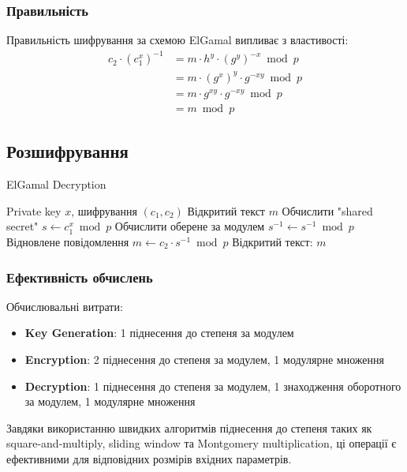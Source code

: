 \subsubsection{Правильність}

Правильність шифрування за схемою ElGamal випливає з властивості:
\begin{align*}
    c_2 \cdot (c_1^x)^{-1} & = m \cdot h^y \cdot (g^y)^{-x} \bmod p  \\
                           & = m \cdot (g^x)^y \cdot g^{-xy} \bmod p \\
                           & = m \cdot g^{xy} \cdot g^{-xy} \bmod p  \\
                           & = m \bmod p
\end{align*}

\subsection{Розшифрування}

\begin{algorithm}
    \caption{ElGamal Decryption}
    \begin{algorithmic}[1]
        \Require Private key $x$, шифрування $(c_1, c_2)$
        \Ensure Відкритий текст $m$
        \State Обчислити "shared secret"{} $s \gets c_1^x \bmod p$
        \State Обчислити оберене за модулем $s^{-1} \gets s^{-1} \bmod p$
        \State Відновлене повідомлення $m \gets c_2 \cdot s^{-1} \bmod p$
        \State \Return Відкритий текст: $m$
    \end{algorithmic}
\end{algorithm}

\subsubsection{Ефективність обчислень}

Обчислювальні витрати:
\begin{itemize}
    \item \textbf{Key Generation}: 1 піднесення до степеня за модулем
    \item \textbf{Encryption}: 2 піднесення до степеня за модулем, 1 модулярне множення
    \item \textbf{Decryption}: 1 піднесення до степеня за модулем, 1 знаходження оборотного за модулем, 1 модулярне множення
\end{itemize}

Завдяки використанню швидких алгоритмів піднесення до степеня  таких як square-and-multiply, sliding window та 
Montgomery multiplication, ці операції є ефективними для відповідних розмірів вхідних параметрів.

